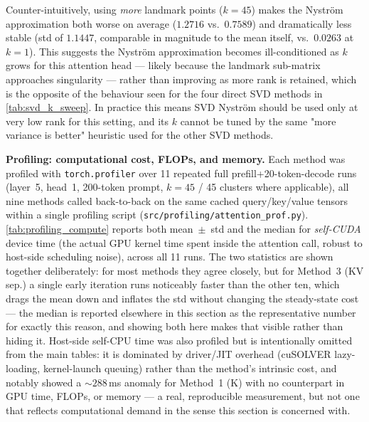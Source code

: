 \noindent Counter-intuitively, using \emph{more} landmark points ($k=45$) makes the Nyström
approximation both worse on average ($1.2716$ vs.\ $0.7589$) and dramatically less stable
(std of $1.1447$, comparable in magnitude to the mean itself, vs.\ $0.0263$ at $k=1$). This
suggests the Nyström approximation becomes ill-conditioned as $k$ grows for this attention head
--- likely because the landmark sub-matrix approaches singularity --- rather than improving as
more rank is retained, which is the opposite of the behaviour seen for the four direct SVD
methods in \autoref{tab:svd_k_sweep}. In practice this means SVD Nyström should be used only at
very low rank for this setting, and its $k$ cannot be tuned by the same "more variance is better"
heuristic used for the other SVD methods.


\noindent\textbf{Profiling: computational cost, FLOPs, and memory.} Each method was profiled
with \texttt{torch.profiler} over 11 repeated full prefill+20-token-decode runs (layer~5,
head~1, 200-token prompt, $k=45$ / 45 clusters where applicable), all nine methods called
back-to-back on the same cached query/key/value tensors within a single profiling script
(\texttt{src/profiling/attention\_prof.py}). \autoref{tab:profiling_compute} reports both
mean~$\pm$~std and the median for \emph{self-CUDA} device time (the actual GPU kernel time
spent inside the attention call, robust to host-side scheduling noise), across all 11 runs.
The two statistics are shown together deliberately: for most methods they agree closely, but
for Method~3 (KV sep.) a single early iteration runs noticeably faster than the other ten,
which drags the mean down and inflates the std without changing the steady-state cost --- the
median is reported elsewhere in this section as the representative number for exactly this
reason, and showing both here makes that visible rather than hiding it. Host-side self-CPU
time was also profiled but is intentionally omitted from the main tables: it is dominated by
driver/JIT overhead (cuSOLVER lazy-loading, kernel-launch queuing) rather than the method's
intrinsic cost, and notably showed a $\sim\!288$\,ms anomaly for Method~1 (K) with no
counterpart in GPU time, FLOPs, or memory --- a real, reproducible measurement, but not one
that reflects computational demand in the sense this section is concerned with.

